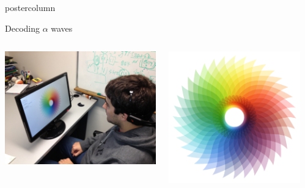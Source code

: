 \documentclass[final]{beamer}
\begin{document}
\begin{frame}
\begin{columns}
\begin{column}{.49\textwidth}
\begin{beamercolorbox}[center,wd=\textwidth]{postercolumn}
\begin{minipage}[T]{.95\textwidth}
{\begin{block}{Decoding $ \alpha$  waves}
               \begin{columns}
              	\begin{column}{.33\textwidth}
				\centering \includegraphics[width=0.95\linewidth]{images/viola/subject}
				\end{column}
				\begin{column}{.33\textwidth}
				\centering \includegraphics[width=0.95\linewidth]{images/viola/calibration}
				\end{column}
				\begin{column}{.33\textwidth}

\end{column}
\end{columns}
\end{block}}
\end{minipage}
\end{beamercolorbox}
\end{column}
\end{columns}
\end{frame}
\end{document}
